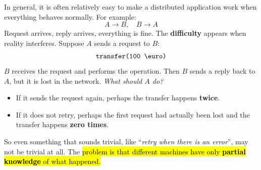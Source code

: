 \highspace
In general, it is often relatively easy to make a distributed application work when everything behaves normally. For example:
\begin{equation*}
    A \to B, \quad B \to A
\end{equation*}
Request arrives, reply arrives, everything is fine. The \textbf{difficulty} appears when reality interferes. Suppose $A$ sends a request to $B$:
\begin{equation*}
    \texttt{transfer(100 \euro)}
\end{equation*}
$B$ receives the request and performs the operation. Then $B$ sends a reply back to $A$, but it is lost in the network. \emph{What should $A$ do?}
\begin{itemize}
    \item If it sends the request again, perhaps the transfer happens \textbf{twice}.
    \item If it does not retry, perhaps the first request had actually been lost and the transfer happens \textbf{zero times}.
\end{itemize}
So even something that sounds trivial, like ``\emph{retry when there is an error}'', may not be trivial at all. The \hl{problem is that different machines have only \textbf{partial knowledge} of what happened.}

